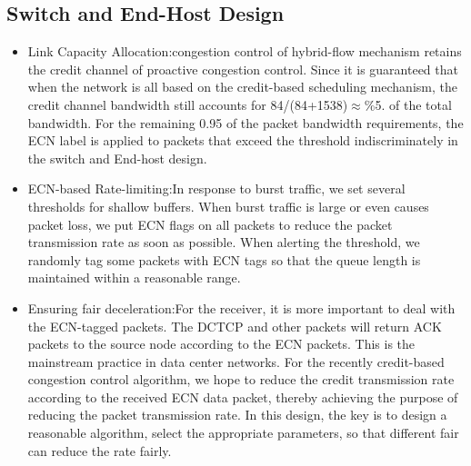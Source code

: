 \documentclass[conference]{IEEEtran}
\begin{document}
\subsection{Switch and End-Host Design}
\begin{itemize}
\item  Link Capacity Allocation:congestion control of hybrid-flow mechanism retains the credit channel of proactive congestion control. Since it is guaranteed that when the network is all based on the credit-based scheduling mechanism, the credit channel bandwidth still accounts for 84/(84+1538)$\approx$\%5.
    of the total bandwidth. For the remaining 0.95 of the packet bandwidth requirements, the ECN label is applied to packets that exceed the threshold indiscriminately in the switch and End-host design.
\item ECN-based Rate-limiting:In response to burst traffic, we set several thresholds for shallow buffers. When burst traffic is large or even causes packet loss, we put ECN flags on all packets to reduce the packet transmission rate as soon as possible. When alerting the threshold, we randomly tag some packets with ECN tags so that the queue length is maintained within a reasonable range.
\item Ensuring fair deceleration:For the receiver, it is more important to deal with the ECN-tagged packets. The DCTCP and other packets will return ACK packets to the source node according to the ECN packets. This is the mainstream practice in data center networks. For the recently credit-based congestion control algorithm, we hope to reduce the credit transmission rate according to the received ECN data packet, thereby achieving the purpose of reducing the packet transmission rate. In this design, the key is to design a reasonable algorithm, select the appropriate parameters, so that different fair can reduce the rate fairly.
\end{itemize}
\end{document}
